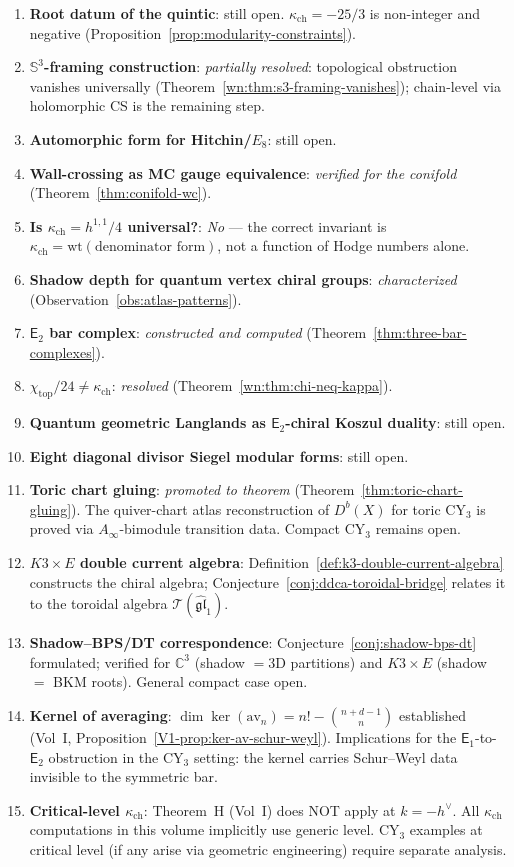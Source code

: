 \documentclass[11pt]{article}
\newcommand{\fgl}{\mathfrak{gl}}
\newcommand{\C}{\mathbb{C}}
\newcommand{\bS}{\mathbb{S}}
\newcommand{\Eone}{\mathsf{E}_1}
\newcommand{\Etwo}{\mathsf{E}_2}
\begin{document}
\begin{enumerate}
 \item \textbf{Root datum of the quintic}: still open. $\kappa_{\mathrm{ch}} = -25/3$ is non-integer and negative (Proposition~\ref{prop:modularity-constraints}).
 \item \textbf{$\bS^3$-framing construction}: \emph{partially resolved}: topological obstruction vanishes universally (Theorem~\ref{wn:thm:s3-framing-vanishes}); chain-level via holomorphic CS is the remaining step.
 \item \textbf{Automorphic form for Hitchin/$E_8$}: still open.
 \item \textbf{Wall-crossing as MC gauge equivalence}: \emph{verified for the conifold} (Theorem~\ref{thm:conifold-wc}).
 \item \textbf{Is $\kappa_{\mathrm{ch}} = h^{1,1}/4$ universal?}: \emph{No} --- the correct invariant is $\kappa_{\mathrm{ch}} = \mathrm{wt}(\text{denominator form})$, not a function of Hodge numbers alone.
 \item \textbf{Shadow depth for quantum vertex chiral groups}: \emph{characterized} (Observation~\ref{obs:atlas-patterns}).
 \item \textbf{$\Etwo$ bar complex}: \emph{constructed and computed} (Theorem~\ref{thm:three-bar-complexes}).
 \item \textbf{$\chi_{\mathrm{top}}/24 \neq \kappa_{\mathrm{ch}}$}: \emph{resolved} (Theorem~\ref{wn:thm:chi-neq-kappa}).
 \item \textbf{Quantum geometric Langlands as $\Etwo$-chiral Koszul duality}: still open.
 \item \textbf{Eight diagonal divisor Siegel modular forms}: still open.
 \item \textbf{Toric chart gluing}: \emph{promoted to theorem} (Theorem~\ref{thm:toric-chart-gluing}). The quiver-chart atlas reconstruction of $D^b(X)$ for toric CY$_3$ is proved via $A_\infty$-bimodule transition data. Compact CY$_3$ remains open.
 \item \textbf{$K3 \times E$ double current algebra}: Definition~\ref{def:k3-double-current-algebra} constructs the chiral algebra; Conjecture~\ref{conj:ddca-toroidal-bridge} relates it to the toroidal algebra $\mathcal{T}(\widehat{\fgl}_1)$.
 \item \textbf{Shadow--BPS/DT correspondence}: Conjecture~\ref{conj:shadow-bps-dt} formulated; verified for $\C^3$ (shadow $= 3$D partitions) and $K3 \times E$ (shadow $=$ BKM roots). General compact case open.
 \item \textbf{Kernel of averaging}: $\dim\ker(\mathrm{av}_n) = n! - \binom{n+d-1}{n}$ established (Vol~I, Proposition~\ref*{V1-prop:ker-av-schur-weyl}). Implications for the $\Eone$-to-$\Etwo$ obstruction in the CY$_3$ setting: the kernel carries Schur--Weyl data invisible to the symmetric bar.
 \item \textbf{Critical-level $\kappa_{\mathrm{ch}}$}: Theorem~H (Vol~I) does NOT apply at $k = -h^\vee$. All $\kappa_{\mathrm{ch}}$ computations in this volume implicitly use generic level. CY$_3$ examples at critical level (if any arise via geometric engineering) require separate analysis.
\end{enumerate}
\end{document}
